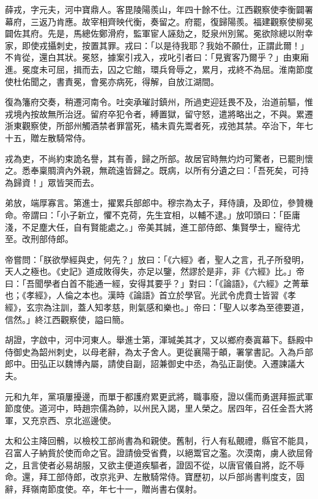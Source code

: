 \begin{pinyinscope}
 薛戎，字元夫，河中寶鼎人。客毘陵陽羨山，年四十餘不仕。江西觀察使李衡闢署幕府，三返乃肯應。故宰相齊映代衡，奏留之。府罷，復歸陽羨。福建觀察使柳冕闢佐其府。先是，馬總佐鄭滑府，監軍宦人誣劾之，貶泉州別駕。冕欲除總以附幸家，即使戎攝刺史，按置其罪。戎曰：「以是待我耶？我始不願仕，正謂此爾！」不肯從，還白其狀。冕怒，據案引戎入，戎叱引者曰：「見賓客乃爾乎？」由東廂進。冕度未可屈，揖而去，囚之它館，環兵脅辱之，累月，戎終不為屈。淮南節度使杜佑聞之，書責冕，會冕亦病死，得解，自放江湖間。



 復為籓府交奏，稍遷河南令。吐突承璀討鎮州，所過吏迎廷畏不及，治道前驅，惟戎境內按故無所治迓。留府卒犯令者，縛置獄，留守怒，遣將略出之，不與。累遷浙東觀察使，所部州觸酒禁者罪當死，橘未貢先鬻者死，戎弛其禁。卒治下，年七十五，贈左散騎常侍。



 戎為吏，不尚約束詭名譽，其有善，歸之所部。故居官時無灼灼可驚者，已罷則懷之。悉奉稟賙濟內外親，無疏遠皆歸之。既病，以所有分遺之曰：「吾死矣，可持為歸資！」眾皆哭而去。



 弟放，端厚寡言。第進士，擢累兵部郎中。穆宗為太子，拜侍讀，及即位，參贊機命。帝謂曰：「小子新立，懼不克荷，先生宜相，以輔不逮。」放叩頭曰：「臣庸淺，不足塵大任，自有賢能處之。」帝美其誠，進工部侍郎、集賢學士，寵待尤至。改刑部侍郎。



 帝嘗問：「朕欲學經與史，何先？」放曰：「《六經》者，聖人之言，孔子所發明，天人之極也。《史記》道成敗得失，亦足以鑒，然謬於是非，非《六經》比。」帝曰：「吾聞學者白首不能通一經，安得其要乎？」對曰：「《論語》，《六經》之菁華也；《孝經》，人倫之本也。漢時《論語》首立於學官。光武令虎賁士皆習《孝經》，玄宗為注訓，蓋人知孝慈，則氣感和樂也。」帝曰：「聖人以孝為至德要道，信然。」終江西觀察使，謚曰簡。



 胡證，字啟中，河中河東人。舉進士第，渾瑊美其才，又以鄉府奏寘幕下。繇殿中侍御史為韶州刺史，以母老辭，為太子舍人。更從襄陽于頔，署掌書記。入為戶部郎中。田弘正以魏博內屬，請使自副，詔兼御史中丞，為弘正副使。入遷諫議大夫。



 元和九年，黨項屢擾邊，而單于都護府累更武將，職事廢，證以儒而勇選拜振武軍節度使。道河中，時趙宗儒為帥，以州民入謁，里人榮之。居四年，召任金吾大將軍，又充京西、京北巡邊使。



 太和公主降回鶻，以檢校工部尚書為和親使。舊制，行人有私覿禮，縣官不能具，召富人子納貲於使而命之官。證請儉受省費，以絕鬻官之濫。次漠南，虜人欲屈脅之，且言使者必易胡服，又欲主便道疾驅者，證固不從，以唐官儀自將，訖不辱命。還，拜工部侍郎，改京兆尹、左散騎常侍。寶歷初，以戶部尚書判度支，固辭，拜嶺南節度使。卒，年七十一，贈尚書右僕射。




\end{pinyinscope}
